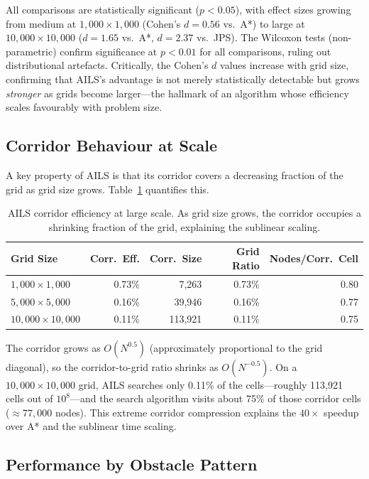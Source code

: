 \documentclass[journal]{IEEEtran}
\begin{document}
All comparisons are statistically significant ($p < 0.05$), with effect sizes growing from medium at $1{,}000{\times}1{,}000$ (Cohen's $d = 0.56$ vs.\ A*) to large at $10{,}000{\times}10{,}000$ ($d = 1.65$ vs.\ A*, $d = 2.37$ vs.\ JPS).
The Wilcoxon tests (non-parametric) confirm significance at $p < 0.01$ for all comparisons, ruling out distributional artefacts.
Critically, the Cohen's $d$ values increase with grid size, confirming that AILS's advantage is not merely statistically detectable but grows \emph{stronger} as grids become larger---the hallmark of an algorithm whose efficiency scales favourably with problem size.

\subsection{Corridor Behaviour at Scale}

A key property of AILS is that its corridor covers a decreasing fraction of the grid as grid size grows.
Table~\ref{tab:corridor_scale} quantifies this.

\begin{table}[h]
\centering
\caption{AILS corridor efficiency at large scale. As grid size grows, the corridor occupies a shrinking fraction of the grid, explaining the sublinear scaling.}
\label{tab:corridor_scale}
\footnotesize
\setlength{\tabcolsep}{4pt}
\begin{tabular}{lrrrr}
\toprule
Grid Size & Corr.\ Eff. & Corr.\ Size & Grid Ratio & Nodes/Corr.\ Cell \\
\midrule
$1{,}000{\times}1{,}000$   & 0.73\% & 7,263   & 0.73\% & 0.80 \\
$5{,}000{\times}5{,}000$   & 0.16\% & 39,946  & 0.16\% & 0.77 \\
$10{,}000{\times}10{,}000$ & 0.11\% & 113,921 & 0.11\% & 0.75 \\
\bottomrule
\end{tabular}
\normalsize
\end{table}

The corridor grows as $O(N^{0.5})$ (approximately proportional to the grid diagonal), so the corridor-to-grid ratio shrinks as $O(N^{-0.5})$.
On a $10{,}000{\times}10{,}000$ grid, AILS searches only 0.11\% of the cells---roughly 113,921 cells out of $10^8$---and the search algorithm visits about 75\% of those corridor cells ($\approx 77,000$ nodes).
This extreme corridor compression explains the $40{\times}$ speedup over A* and the sublinear time scaling.

\subsection{Performance by Obstacle Pattern}
\end{document}
